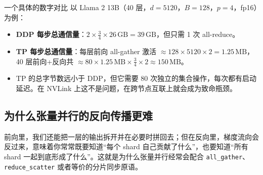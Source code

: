 \documentclass[a4paper]{article}
\begin{document}
\begin{table}[H]
\centering
\small
{}
\caption{数据并行 vs 张量并行通信量对比}
\end{table}

\begin{knowledgebox}{一个具体的数字对比}
以 Llama 2 13B（40 层，$d=5120$，$B=128$，$p=4$，fp16）为例：
\begin{itemize}
    \item \textbf{DDP 每步总通信量}：$2 \times \frac{3}{4} \times 26\,\text{GB} = 39\,\text{GB}$，但只需 1 次 all-reduce。
    \item \textbf{TP 每步总通信量}：每层前向 all-gather 激活 $\approx 128 \times 5120 \times 2 = 1.25\,\text{MB}$，40 层前向+反向共 $\approx 80 \times 1.25\,\text{MB} \times \frac{3}{4} \times 2 \approx 150\,\text{MB}$。
    \item TP 的总字节数远小于 DDP，但它需要 80 次独立的集合操作，每次都有启动延迟。在 NVLink 上这不是问题，在跨节点互联上就会成为致命瓶颈。
\end{itemize}
\end{knowledgebox}

\subsection{为什么张量并行的反向传播更难}

前向里，我们还能把一层的输出拆开并在必要时拼回去；但在反向里，梯度流向会反过来，意味着你常常既要知道“每个 shard 自己贡献了什么”，也要知道“所有 shard 一起到底形成了什么”。这就是为什么张量并行经常会配合 \texttt{all\_gather}、\texttt{reduce\_scatter} 或者等价的分片同步原语。
\end{document}
